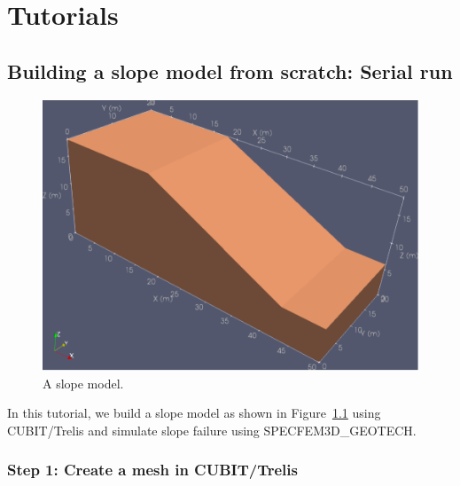 \chapter{Tutorials}
\label{chap:tutorials}

\section{Building a slope model from scratch: Serial run}
\label{sec:cubit}

\begin{figure}[ht]
\centering
\includegraphics[scale=0.7]{cubit_example}
\caption{A slope model.}
\label{fig:slope}
\end{figure}

In this tutorial, we build a slope model as shown in Figure~\ref{fig:slope} using CUBIT/Trelis and simulate slope failure using SPECFEM3D\_GEOTECH.

\subsection*{Step 1: Create a mesh in CUBIT/Trelis}

